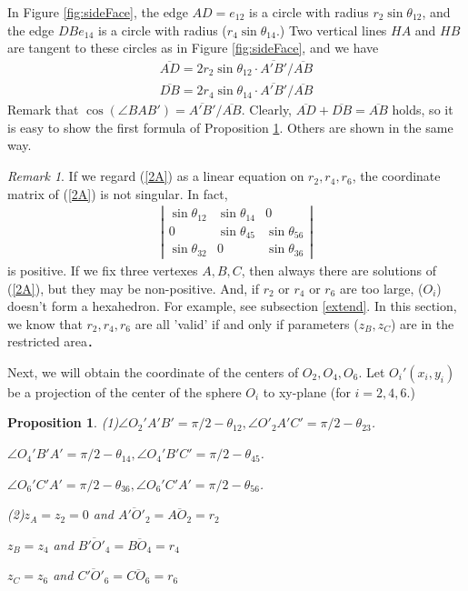 \documentclass[suppldata, dvipdfmx]{interact}
\theoremstyle{plain}%
\newtheorem{proposition}[theorem]{Proposition}
\theoremstyle{definition}
\theoremstyle{remark}
\newtheorem{remark}{Remark}
\theoremstyle{problemstyle}
\begin{document}
 In Figure \ref{fig:sideFace}, the edge $AD = e_{12}$ is a circle with radius
 $r_2\sin\theta_{12}$, and the edge $DB e_{14}$ is a circle with radius
 ($r_4\sin\theta_{14}$.)
Two vertical lines $HA$ and $HB$ are tangent to these circles as in
 Figure \ref{fig:sideFace},
 and we have 
 \begin{eqnarray*}
  \overline{AD} = 2 r_2 \sin\theta_{12} \cdot \overline{A'B'}/\overline{AB}\\
  \overline{DB} = 2 r_4 \sin\theta_{14} \cdot \overline{A'B'}/\overline{AB}
 \end{eqnarray*}
 Remark that $\cos(\angle BAB') =\overline{A'B'}/\overline{AB}.$ Clearly,
 $\overline{AD} + \overline{DB} = \overline{AB}$ holds, so it is easy to
 show the first formula of Proposition \ref{angles}. Others are shown in the same
 way.


\begin{remark}
 If we regard (\ref{2A}) as a linear equation on $r_2, r_4, r_6$, the
 coordinate matrix of (\ref{2A}) is not singular. In fact,
 \begin{eqnarray*}
  \left| 
   \begin{array}{ccc}
    \sin\theta_{12} & \sin\theta_{14} & 0\\
    0               & \sin\theta_{45} & \sin\theta_{56}\\
    \sin\theta_{32} & 0               & \sin\theta_{36}
   \end{array}
  \right|
 \end{eqnarray*}
 is positive.
 If we fix three vertexes $A, B, C$, then always there are solutions of
 (\ref{2A}), but they may be non-positive. And, if $r_2$ or $r_4$ or $r_6$
 are too large, ($O_i$) doesn't form a hexahedron. For example, see
 subsection \ref{extend}. In this section, we know that $r_2, r_4, r_6$ are all
 'valid' if and only if parameters ($z_B, z_C$) are in the restricted area．

Next, we will obtain the coordinate of the centers of $O_2, O_4, O_6$.
Let $O_i'(x_i, y_i)$ be a projection of the center of the sphere $O_i$
 to xy-plane (for $i = 2, 4, 6$.)
\end{remark}

\begin{proposition}\label{angles}
 (1)$\angle O_2'A'B' = \pi/2 - \theta_{12}, \angle
 O'_2A'C'=\pi/2-\theta_{23}$.

  $\angle O_4'B'A' = \pi/2 - \theta_{14}, \angle O_4'B'C' = \pi/2 -
 \theta_{45}$.

 $\angle O_6'C'A' = \pi/2 - \theta_{36}, \angle O_6'C'A' = \pi/2 - \theta_{56}$.

 (2)$z_A = z_2 = 0$ and $\overline{A'O'_2} = \overline{AO_2} = r_2$

 $z_B = z_4$ and $\overline{B'O'_4} = \overline{BO_4} = r_4$

 $z_C = z_6$ and $\overline{C'O'_6} = \overline{CO_6} = r_6$
\end{proposition}
\end{document}
